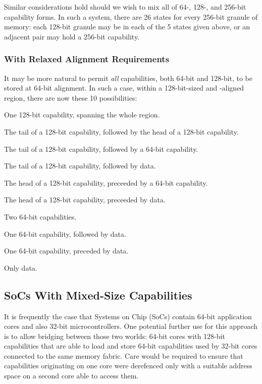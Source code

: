 Similar considerations hold should we wish to mix all of 64-, 128-, and
256-bit capability forms.  In such a system, there are 26 states for every
256-bit granule of memory: each 128-bit granule may be in each of the 5
states given above, or an adjacent pair may hold a 256-bit capability.

\subsubsection{With Relaxed Alignment Requirements} %

It may be more natural to permit \emph{all} capabilities, both 64-bit and
128-bit, to be stored at 64-bit alignment.  In such a case, within a
128-bit-sized and -aligned region, there are now these 10 possibilities:
%
\begin{inenum}
%
  \item One 128-bit capability, spanning the whole region.
%
  \item The tail of a 128-bit capability, followed by the head of a 128-bit capability.
%
  \item The tail of a 128-bit capability, followed by a 64-bit capability.
%
  \item The tail of a 128-bit capability, followed by data.
%
  \item The head of a 128-bit capability, preceeded by a 64-bit capability.
%
  \item The head of a 128-bit capability, preceeded by data.
%
  \item Two 64-bit capabilities.
%
  \item One 64-bit capability, followed by data.
%
  \item One 64-bit capability, preceded by data.
%
  \item Only data.
%
\end{inenum}


\subsection{SoCs With Mixed-Size Capabilities} %

It is frequently the case that Systems on Chip (SoCs) contain 64-bit
application cores and also 32-bit microcontrollers.
One potential further use for this approach is to allow bridging between those
two worlds: 64-bit cores with 128-bit capabilities that are able to load and
store 64-bit capabilities used by 32-bit cores connected to the same memory
fabric.
Care would be required to ensure that capabilities originating on one core
were derefenced only with a suitable address space on a second core able to
access them.

